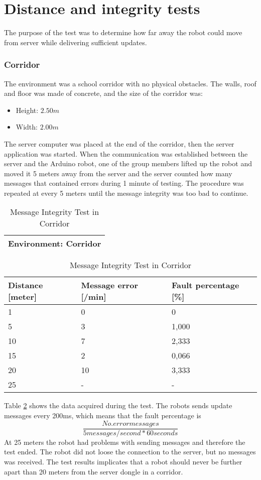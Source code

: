 \newpage
\section{Distance and integrity tests}
\label{sec:testcom}
The purpose of the test was to determine how far away the robot could move from server while delivering sufficient updates.
\subsubsection{Corridor}
The environment was a school corridor with no physical obstacles. The walls, roof and floor was made of concrete, and the size of the corridor was:
\begin{itemize}
    \item Height: $2.50 m$
    \item Width: $2.00 m$
\end{itemize}
The server computer was placed at the end of the corridor, then the server application was started. When the communication was established between the server and the Arduino robot, one of the group members lifted up the robot and moved it 5 meters away from the server and the server counted how many messages that contained errors during 1 minute of testing. The procedure was repeated at every 5 meters until the message integrity was too bad to continue.
\newpage
{}

\begin{table}[ht]
\begin{center}
 \begin{tabular}{|p{100pt}|} 
 \hline
 Environment: \textbf{Corridor}\\
 \hline
 \end{tabular}
 \begin{tabular}{|p{90pt}|p{100pt}|p{90pt}|}
 \hline
 Distance [meter] & Message error [/min] &  Fault percentage [\%]\\
 \hline
 1		        &   0 		&	0    \\
 5              &   3  		&	1,000\\
 10             &   7  		&	2,333\\
 15				&	2 		&	0,066\\
 20				&	10 		&	3,333\\
 25				&	-		&	-    \\
 \hline
\end{tabular}
\end{center}
\caption{Message Integrity Test in Corridor}
\label{tab:messintegritycorr}
\end{table}
Table \ref{tab:messintegritycorr} shows the data acquired during the test. The robots sends update messages every 200ms, which means that the fault percentage is $$\frac{No. error messages}{5 messages/second * 60 seconds}$$
At 25 meters the robot had problems with sending messages and therefore the test ended. The robot did not loose the connection to the server, but no messages was received. The test results implicates that a robot should never be further apart than 20 meters from the server dongle in a corridor.

